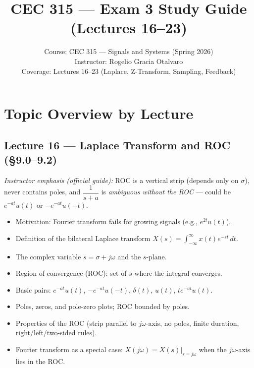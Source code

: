 \documentclass{article}
\title{CEC 315 --- Exam 3 Study Guide (Lectures 16--23)}
\author{Course: CEC 315 --- Signals and Systems (Spring 2026)\\
Instructor: Rogelio Gracia Otalvaro\\
Coverage: Lectures 16--23 (Laplace, Z-Transform, Sampling, Feedback)}
\date{}
\begin{document}
\maketitle

\begin{center}
\end{center}

\tableofcontents
\newpage

\section{Topic Overview by Lecture}

\subsection*{Lecture 16 --- Laplace Transform and ROC (\S9.0--9.2)}

\noindent\emph{Instructor emphasis (official guide):} ROC is a vertical strip (depends only on $\sigma$), never contains poles, and $\dfrac{1}{s+a}$ is \emph{ambiguous without the ROC} --- could be $e^{-at}u(t)$ or $-e^{-at}u(-t)$.

\begin{itemize}
  \item Motivation: Fourier transform fails for growing signals (e.g., $e^{2t}u(t)$).
  \item Definition of the bilateral Laplace transform $X(s) = \int_{-\infty}^{\infty} x(t) e^{-st}\,dt$.
  \item The complex variable $s = \sigma + j\omega$ and the $s$-plane.
  \item Region of convergence (ROC): set of $s$ where the integral converges.
  \item Basic pairs: $e^{-at}u(t)$, $-e^{-at}u(-t)$, $\delta(t)$, $u(t)$, $t e^{-at}u(t)$.
  \item Poles, zeros, and pole-zero plots; ROC bounded by poles.
  \item Properties of the ROC (strip parallel to $j\omega$-axis, no poles, finite duration, right/left/two-sided rules).
  \item Fourier transform as a special case: $X(j\omega) = X(s)\big|_{s=j\omega}$ when the $j\omega$-axis lies in the ROC.
\end{itemize}
\end{document}
